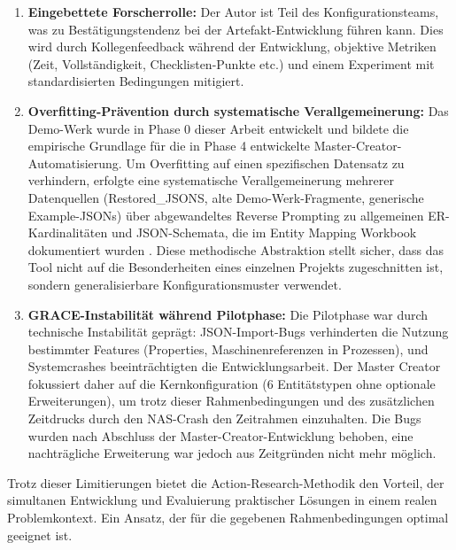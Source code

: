 \begin{enumerate}
    \item \textbf{Eingebettete Forscherrolle:} Der Autor ist Teil des Konfigurationsteams, was zu Bestätigungstendenz bei der Artefakt-Entwicklung führen kann. Dies wird durch Kollegenfeedback während der Entwicklung, objektive Metriken (Zeit, Vollständigkeit, Checklisten-Punkte etc.) und einem Experiment mit standardisierten Bedingungen mitigiert.

    \item \textbf{Overfitting-Prävention durch systematische Verallgemeinerung:} Das Demo-Werk wurde in Phase 0 dieser Arbeit entwickelt und bildete die empirische Grundlage für die in Phase 4 entwickelte Master-Creator-Automatisierung. Um Overfitting auf einen spezifischen Datensatz zu verhindern, erfolgte eine systematische Verallgemeinerung mehrerer Datenquellen (Restored\_JSONS, alte Demo-Werk-Fragmente, generische Example-JSONs) über abgewandeltes Reverse Prompting zu allgemeinen ER-Kardinalitäten und JSON-Schemata, die im Entity Mapping Workbook dokumentiert wurden \citep{mayring:qualitative2015}. Diese methodische Abstraktion stellt sicher, dass das Tool nicht auf die Besonderheiten eines einzelnen Projekts zugeschnitten ist, sondern generalisierbare Konfigurationsmuster verwendet.

    \item \textbf{GRACE-Instabilität während Pilotphase:} Die Pilotphase war durch technische Instabilität geprägt: JSON-Import-Bugs verhinderten die Nutzung bestimmter Features (Properties, Maschinenreferenzen in Prozessen), und Systemcrashes beeinträchtigten die Entwicklungsarbeit. Der Master Creator fokussiert daher auf die Kernkonfiguration (6 Entitätstypen ohne optionale Erweiterungen), um trotz dieser Rahmenbedingungen und des zusätzlichen Zeitdrucks durch den NAS-Crash den Zeitrahmen einzuhalten. Die Bugs wurden nach Abschluss der Master-Creator-Entwicklung behoben, eine nachträgliche Erweiterung war jedoch aus Zeitgründen nicht mehr möglich.
\end{enumerate}

\noindent Trotz dieser Limitierungen bietet die Action-Research-Methodik den Vorteil, der simultanen Entwicklung und Evaluierung praktischer Lösungen in einem realen Problemkontext. Ein Ansatz, der für die gegebenen Rahmenbedingungen optimal geeignet ist.
